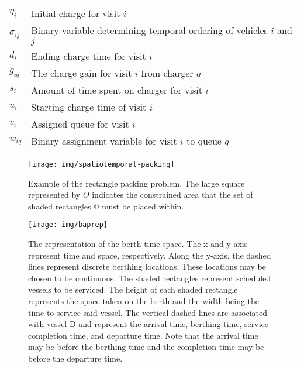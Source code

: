 \documentclass[utf8]{FrontiersinHarvard}
\begin{document}
\begin{table}[!htpb]
\begin{tabularx}{\textwidth}{l l}
    $\eta_i$    & Initial charge for visit $i$                                                                                \\
    $\sigma_{ij}$ & Binary variable determining temporal ordering of vehicles $i$ and $j$                                       \\
    $d_i$    & Ending charge time for visit $i$                                                                            \\
    $g_{iq}$ & The charge gain for visit $i$ from charger $q$                                                              \\
    $s_i$    & Amount of time spent on charger for visit $i$                                                               \\
    $u_i$    & Starting charge time of visit $i$                                                                           \\
    $v_i$    & Assigned queue for visit $i$                                                                                \\
    $w_{iq}$ & Binary assignment variable for visit $i$ to queue $q$                                                       \\
    \bottomrule
  \end{tabularx}
\end{table}

\begin{figure}[htpb]
\centering
    \texttt{[image: img/spatiotemporal-packing]}
    \caption{Example of the rectangle packing problem. The large square represented by $O$ indicates the constrained
      area that the set of shaded rectangles $\mathbb{O}$ must be placed within.}
    \label{fig:packexample}
\end{figure}

\begin{figure}[ht]
\centering
    \texttt{[image: img/baprep]}
    \caption{The representation of the berth-time space. The x and y-axis represent time and space, respectively. Along
      the y-axis, the dashed lines represent discrete berthing locations. These locations may be chosen to be
      continuous. The shaded rectangles represent scheduled vessels to be serviced. The height of each shaded rectangle
      represents the space taken on the berth and the width being the time to service said vessel. The vertical dashed
      lines are associated with vessel D and represent the arrival time, berthing time, service completion time, and
      departure time. Note that the arrival time may be before the berthing time and the completion time may be before
      the departure time.}
    \label{fig:bap}
\end{figure}
\end{document}
